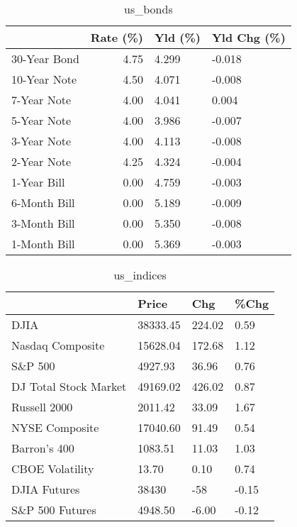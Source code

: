\documentclass{article}%
\begin{document}
\begin{table}[htbp]%
\caption{us\_bonds}%
\centering%
\begin{adjustbox}{width=1\textwidth}%
\begin{tabular}{lrll}
\toprule
             &  Rate (\%) & Yld (\%) & Yld Chg (\%) \\
\midrule
30-Year Bond &      4.75 &   4.299 &      -0.018 \\
10-Year Note &      4.50 &   4.071 &      -0.008 \\
 7-Year Note &      4.00 &   4.041 &       0.004 \\
 5-Year Note &      4.00 &   3.986 &      -0.007 \\
 3-Year Note &      4.00 &   4.113 &      -0.008 \\
 2-Year Note &      4.25 &   4.324 &      -0.004 \\
 1-Year Bill &      0.00 &   4.759 &      -0.003 \\
6-Month Bill &      0.00 &   5.189 &      -0.009 \\
3-Month Bill &      0.00 &   5.350 &      -0.008 \\
1-Month Bill &      0.00 &   5.369 &      -0.003 \\
\bottomrule
\end{tabular}
%
\end{adjustbox}%
\end{table}

%


\begin{table}[htbp]%
\caption{us\_indices}%
\centering%
\begin{adjustbox}{width=1\textwidth}%
\begin{tabular}{llll}
\toprule
                      &    Price &    Chg &  \%Chg \\
\midrule
                 DJIA & 38333.45 & 224.02 &  0.59 \\
     Nasdaq Composite & 15628.04 & 172.68 &  1.12 \\
              S\&P 500 &  4927.93 &  36.96 &  0.76 \\
DJ Total Stock Market & 49169.02 & 426.02 &  0.87 \\
         Russell 2000 &  2011.42 &  33.09 &  1.67 \\
       NYSE Composite & 17040.60 &  91.49 &  0.54 \\
         Barron's 400 &  1083.51 &  11.03 &  1.03 \\
      CBOE Volatility &    13.70 &   0.10 &  0.74 \\
         DJIA Futures &    38430 &    -58 & -0.15 \\
      S\&P 500 Futures &  4948.50 &  -6.00 & -0.12 \\
\bottomrule
\end{tabular}
%
\end{adjustbox}%
\end{table}
\end{document}
